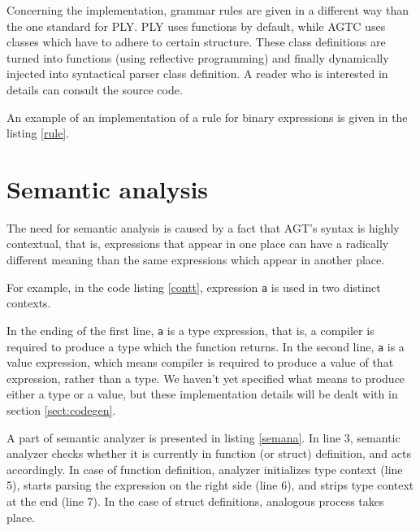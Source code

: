 \documentclass[times, utf8, diplomski]{fer}
\theoremstyle{definition}
\newcommand{\textcode}[3]{
    
}
\begin{document}
\textcode{\resdir/compiler/ast}{ast}{AST resulting from \texttt{let n = in<i32>();}}

Concerning the implementation, grammar rules are given in a different way than the
one standard for PLY. PLY uses functions by default, while AGTC uses
classes which have to adhere to certain structure. These class definitions
are turned into functions (using reflective programming) and finally
dynamically injected into syntactical parser class definition.
A reader who is interested in details can consult the source code.

An example of an implementation of a rule for binary expressions is given in the listing \ref{rule}.
\\

\textcode{\resdir/compiler/rule.py}{rule}{Binary expression rule implementation}

\section{Semantic analysis}

The need for semantic analysis is caused by a fact that AGT's syntax is highly contextual,
that is, expressions that appear in one place can have a radically different meaning
than the same expressions which appear in another place.

For example, in the code listing \ref{contt}, expression \texttt{a} is used in two distinct contexts.

\textcode{\resdir/compiler/contextual.agt}{contt}{Contextuality of expression \texttt{a}}

In the ending of the first line, \texttt{a} is a type expression, that is, a
compiler is required to produce a type which the function returns. In the
second line, \texttt{a} is a value expression,
which means compiler is required to produce a value of that expression, rather than a type.
We haven't yet specified what means to produce either a type or a value, but these implementation
details will be dealt with in section \ref{sect:codegen}.

A part of semantic analyzer is presented in listing \ref{semana}.
In line 3, semantic analyzer checks whether it is currently in function (or struct) definition, 
and acts accordingly. In case of function definition, analyzer initializes type context (line 5),
starts parsing the expression on the right side (line 6), 
and strips type context at the end (line 7).
In the case of struct definitions, analogous process takes place.
\end{document}
